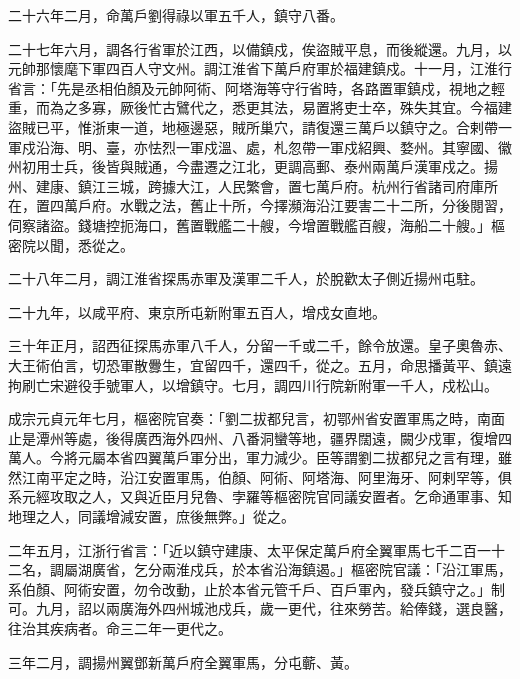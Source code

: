 \begin{pinyinscope}
 二十六年二月，命萬戶劉得祿以軍五千人，鎮守八番。



 二十七年六月，調各行省軍於江西，以備鎮戍，俟盜賊平息，而後縱還。九月，以元帥那懷麾下軍四百人守文州。調江淮省下萬戶府軍於福建鎮戍。十一月，江淮行省言：「先是丞相伯顏及元帥阿術、阿塔海等守行省時，各路置軍鎮戍，視地之輕重，而為之多寡，厥後忙古鷿代之，悉更其法，易置將吏士卒，殊失其宜。今福建盜賊已平，惟浙東一道，地極邊惡，賊所巢穴，請復還三萬戶以鎮守之。合剌帶一軍戍沿海、明、臺，亦怯烈一軍戍溫、處，札忽帶一軍戍紹興、婺州。其寧國、徽州初用士兵，後皆與賊通，今盡遷之江北，更調高郵、泰州兩萬戶漢軍戍之。揚州、建康、鎮江三城，跨據大江，人民繁會，置七萬戶府。杭州行省諸司府庫所在，置四萬戶府。水戰之法，舊止十所，今擇瀕海沿江要害二十二所，分後閱習，伺察諸盜。錢塘控扼海口，舊置戰艦二十艘，今增置戰艦百艘，海船二十艘。」樞密院以聞，悉從之。



 二十八年二月，調江淮省探馬赤軍及漢軍二千人，於脫歡太子側近揚州屯駐。



 二十九年，以咸平府、東京所屯新附軍五百人，增戍女直地。



 三十年正月，詔西征探馬赤軍八千人，分留一千或二千，餘令放還。皇子奧魯赤、大王術伯言，切恐軍散釁生，宜留四千，還四千，從之。五月，命思播黃平、鎮遠拘刷亡宋避役手號軍人，以增鎮守。七月，調四川行院新附軍一千人，戍松山。



 成宗元貞元年七月，樞密院官奏：「劉二拔都兒言，初鄂州省安置軍馬之時，南面止是潭州等處，後得廣西海外四州、八番洞蠻等地，疆界闊遠，闕少戍軍，復增四萬人。今將元屬本省四翼萬戶軍分出，軍力減少。臣等謂劉二拔都兒之言有理，雖然江南平定之時，沿江安置軍馬，伯顏、阿術、阿塔海、阿里海牙、阿剌罕等，俱系元經攻取之人，又與近臣月兒魯、孛羅等樞密院官同議安置者。乞命通軍事、知地理之人，同議增減安置，庶後無弊。」從之。



 二年五月，江浙行省言：「近以鎮守建康、太平保定萬戶府全翼軍馬七千二百一十二名，調屬湖廣省，乞分兩淮戍兵，於本省沿海鎮遏。」樞密院官議：「沿江軍馬，系伯顏、阿術安置，勿令改動，止於本省元管千戶、百戶軍內，發兵鎮守之。」制可。九月，詔以兩廣海外四州城池戍兵，歲一更代，往來勞苦。給俸錢，選良醫，往治其疾病者。命三二年一更代之。



 三年二月，調揚州翼鄧新萬戶府全翼軍馬，分屯蘄、黃。




\end{pinyinscope}
